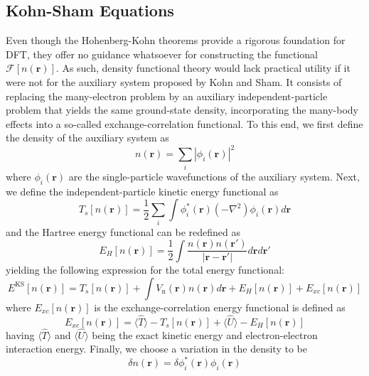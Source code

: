 \subsection{Kohn-Sham Equations}
Even though the Hohenberg-Kohn theorems provide a rigorous foundation for DFT, they offer no guidance whatsoever for constructing the functional $\mathcal{F}[n(\mathbf{r})]$. As such, density functional theory would lack practical utility if it were not for the auxiliary system proposed by Kohn and Sham\supercite{martin2020electronic}. It consists of replacing the many-electron problem by an auxiliary independent-particle problem that yields the same ground-state density, incorporating the many-body effects into a so-called exchange-correlation functional. To this end, we first define the density of the auxiliary system as
\begin{equation}
  n(\mathbf{r}) = \sum_i |\phi_i(\mathbf{r})|^2
  \label{eq49}
\end{equation}
where $\phi_i(\mathbf{r})$ are the single-particle wavefunctions of the auxiliary system. Next, we define the independent-particle kinetic energy functional as 
\begin{equation}
  \label{eq50}
  T_s[n(\mathbf{r})] = \frac{1}{2}\sum_i \int \phi_i^*(\mathbf{r}) (-\nabla^2 )\phi_i(\mathbf{r}) d\mathbf{r}
\end{equation}
and the Hartree energy functional can be redefined as 
\begin{equation}
  \label{eq51}
  E_H[n(\mathbf{r})] = \frac{1}{2} \int \frac{n(\mathbf{r}) n(\mathbf{r'})}{|\mathbf{r} - \mathbf{r'}|} d\mathbf{r} d\mathbf{r'}
\end{equation}
yielding the following expression for the total energy functional:
\begin{equation}
  \label{eq52}
  E^{\text{KS}}[n(\mathbf{r})] = T_s[n(\mathbf{r})] + \int V_{\text{n}}(\mathbf{r}) n(\mathbf{r}) d\mathbf{r} + E_H[n(\mathbf{r})] + E_{xc}[n(\mathbf{r})]
\end{equation}
where $E_{xc}[n(\mathbf{r})]$ is the exchange-correlation energy functional is defined as
\begin{equation}
  \label{eq53}
  E_{xc}[n(\mathbf{r})] = \langle \hat{T} \rangle - T_s[n(\mathbf{r})] + \langle \hat{U}\rangle - E_H[n(\mathbf{r})]
\end{equation}
having $\langle \hat{T} \rangle$ and $\langle \hat{U} \rangle$ being the exact kinetic energy and electron-electron interaction energy. Finally, we choose a variation in the density to be 
\begin{equation}
  \delta n(\mathbf{r}) = \delta \phi_i^*(\mathbf{r}) \phi_i(\mathbf{r}) 
  \label{eq54}
\end{equation}
